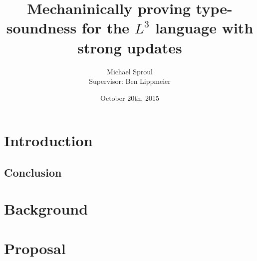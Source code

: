 \documentclass[a4paper,12pt]{article}
\title{Mechaninically proving type-soundness for the $L^3$ language with strong updates}
\author{
	Michael Sproul\\
	Supervisor: Ben Lippmeier
}
\date{October 20th, 2015}
\begin{document}
\maketitle

\section{Introduction}

\subsection{}

\subsection{}

\subsection{Conclusion}

\section{Background}

\section{Proposal}
\end{document}
